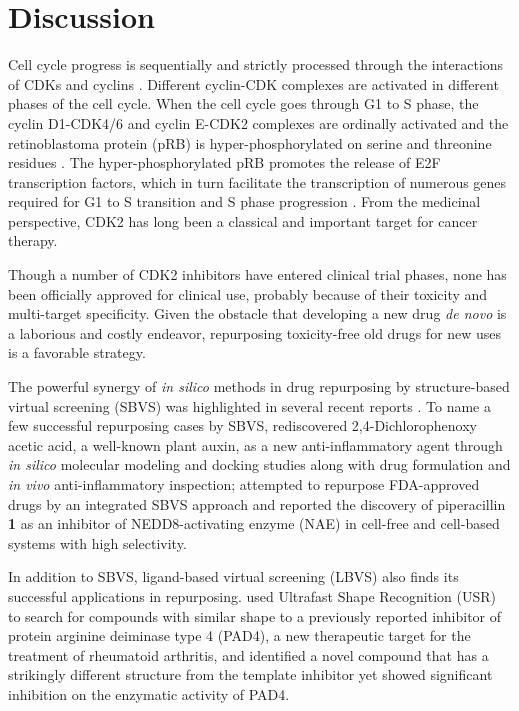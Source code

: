 \documentclass[10pt]{article}
\begin{document}
\section*{Discussion}

Cell cycle progress is sequentially and strictly processed through the interactions of CDKs and cyclins \cite{1612}. Different cyclin-CDK complexes are activated in different phases of the cell cycle. When the cell cycle goes through G1 to S phase, the cyclin D1-CDK4/6 and cyclin E-CDK2 complexes are ordinally activated and the retinoblastoma protein (pRB) is hyper-phosphorylated on serine and threonine residues \cite{1613}. The hyper-phosphorylated pRB promotes the release of E2F transcription factors, which in turn facilitate the transcription of numerous genes required for G1 to S transition and S phase progression \cite{1614}. From the medicinal perspective, CDK2 has long been a classical and important target for cancer therapy.

Though a number of CDK2 inhibitors have entered clinical trial phases, none has been officially approved for clinical use, probably because of their toxicity and multi-target specificity. Given the obstacle that developing a new drug \textit{de novo} is a laborious and costly endeavor, repurposing toxicity-free old drugs for new uses is a favorable strategy.

The powerful synergy of \textit{in silico} methods in drug repurposing by structure-based virtual screening (SBVS) was highlighted in several recent reports \cite{1384}. To name a few successful repurposing cases by SBVS, \cite{1507} rediscovered 2,4-Dichlorophenoxy acetic acid, a well-known plant auxin, as a new anti-inflammatory agent through \textit{in silico} molecular modeling and docking studies along with drug formulation and \textit{in vivo} anti-inflammatory inspection; \cite{1506} attempted to repurpose FDA-approved drugs by an integrated SBVS approach and reported the discovery of piperacillin \textbf{1} as an inhibitor of NEDD8-activating enzyme (NAE) in cell-free and cell-based systems with high selectivity.

In addition to SBVS, ligand-based virtual screening (LBVS) also finds its successful applications in repurposing. \cite{1504} used Ultrafast Shape Recognition (USR) \cite{1379} to search for compounds with similar shape to a previously reported inhibitor of protein arginine deiminase type 4 (PAD4), a new therapeutic target for the treatment of rheumatoid arthritis, and identified a novel compound that has a strikingly different structure from the template inhibitor yet showed significant inhibition on the enzymatic activity of PAD4.
\end{document}
